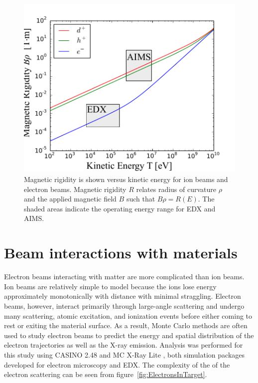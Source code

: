 \documentclass[12pt,letterpaper,final]{article}
\begin{document}
\begin{figure}[!h]
 \centering
  \includegraphics[width=\columnwidth]{figures/MagneticRigidity.pdf}
 \caption{Magnetic rigidity is shown versus kinetic energy for ion beams and electron beams. Magnetic rigidity $R$ relates radius of curvature $\rho$ and the applied magnetic field $B$ such that $B\rho = R(E)$. The shaded areas indicate the operating energy range for EDX and AIMS.}
 \label{fig:Rigidity}
\end{figure}

\section{Beam interactions with materials}
\label{sec:BeamInteractions}
Electron beams interacting with matter are more complicated than ion beams. Ion beams are relatively simple to model because the ions lose energy approximately monotonically with distance with minimal straggling. Electron beams, however, interact primarily through large-angle scattering and undergo many scattering, atomic excitation, and ionization events before either coming to rest or exiting the material surface. As a result, Monte Carlo methods are often used to study electron beams to predict the energy and spatial distribution of the electron trajectories as well as the X-ray emission. Analysis was performed for this study using CASINO 2.48 \cite{CASINO} and MC X-Ray Lite \cite{MCXRayLite}, both simulation packages developed for electron microscopy and EDX. The complexity of the of the electron scattering can be seen from figure~\ref{fig:ElectronsInTarget}.
\end{document}
